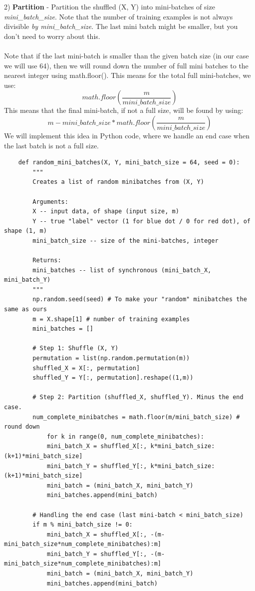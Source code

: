 \documentclass[11pt, a4paper]{article}
\begin{document}
\begin{spacing}{1.1}
	\hspace*{3mm} 2) \textbf{Partition} - Partition the shuffled (X, Y) into mini-batches of size \textit{mini\_batch\_size}. Note that the \hspace*{30mm} number of training examples is not always divisible \textit{by mini\_batch\_size}. The last mini \hspace*{30mm} batch might be smaller, but you don't need to worry about this. \\~\\
	Note that if the last mini-batch is smaller than the given batch size (in our case we will use 64), then we will round down the number of full mini batches to the nearest integer using math.floor(). This means for the total full mini-batches, we use: $$ math.floor(\frac{m}{mini\_batch\_size}) $$ This means that the final mini-batch, if not a full size, will be found by using: $$ m - mini\_batch\_size * math.floor(\frac{m}{mini\_batch\_size}) $$
	We will implement this idea in Python code, where we handle an end case when the last batch is not a full size.	\newpage

	\begin{lstlisting}
	def random_mini_batches(X, Y, mini_batch_size = 64, seed = 0):
		"""
		Creates a list of random minibatches from (X, Y)
		
		Arguments:
		X -- input data, of shape (input size, m)
		Y -- true "label" vector (1 for blue dot / 0 for red dot), of shape (1, m)
		mini_batch_size -- size of the mini-batches, integer
		
		Returns:
		mini_batches -- list of synchronous (mini_batch_X, mini_batch_Y)
		"""
		np.random.seed(seed) # To make your "random" minibatches the same as ours
		m = X.shape[1] # number of training examples
		mini_batches = []
		
		# Step 1: Shuffle (X, Y)
		permutation = list(np.random.permutation(m))
		shuffled_X = X[:, permutation]
		shuffled_Y = Y[:, permutation].reshape((1,m))
		
		# Step 2: Partition (shuffled_X, shuffled_Y). Minus the end case.
		num_complete_minibatches = math.floor(m/mini_batch_size) # round down
			for k in range(0, num_complete_minibatches):
			mini_batch_X = shuffled_X[:, k*mini_batch_size: (k+1)*mini_batch_size]
			mini_batch_Y = shuffled_Y[:, k*mini_batch_size: (k+1)*mini_batch_size]
			mini_batch = (mini_batch_X, mini_batch_Y)
			mini_batches.append(mini_batch)
		
		# Handling the end case (last mini-batch < mini_batch_size)
		if m % mini_batch_size != 0:
			mini_batch_X = shuffled_X[:, -(m-mini_batch_size*num_complete_minibatches):m]
			mini_batch_Y = shuffled_Y[:, -(m-mini_batch_size*num_complete_minibatches):m]
			mini_batch = (mini_batch_X, mini_batch_Y)
			mini_batches.append(mini_batch)
		

\end{lstlisting}
\end{spacing}
\end{document}
